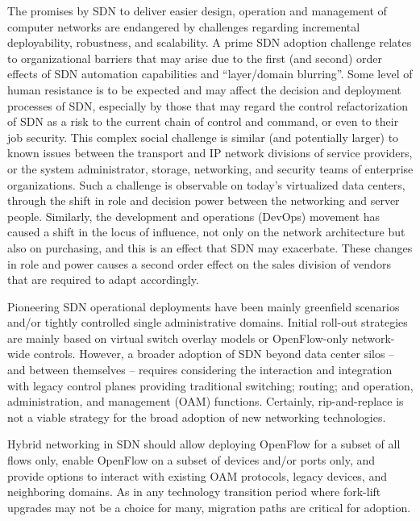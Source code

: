 The promises by SDN to deliver easier design, operation and management of computer networks are endangered
by challenges regarding incremental deployability, robustness, and scalability. 
A prime SDN adoption challenge relates to organizational barriers that may arise due to the first (and second) order 
effects of SDN automation capabilities and ``layer/domain blurring''. 
Some level of human resistance is to be expected and may affect the decision and deployment processes of SDN, especially by those that may regard the 
control refactorization of SDN as a risk to the current chain of control and command, or even to their job security. 
This complex social challenge is similar (and potentially larger) to known issues between the transport and IP 
network divisions of service providers, or the system administrator, storage, networking, and security teams 
of enterprise organizations. Such a challenge is observable on today's virtualized data centers, through the shift 
in role and decision power between the networking and server people. Similarly, the development and operations (DevOps) movement has caused a shift in the locus of influence, not only 
on the network architecture but also on purchasing, and this is an effect that SDN may exacerbate. These changes in role and power causes a second order effect on the sales division of vendors that are required to adapt accordingly. 


Pioneering SDN operational deployments have been mainly greenfield scenarios and/or tightly controlled single 
administrative domains. Initial roll-out strategies are mainly based on virtual switch overlay models or 
OpenFlow-only network-wide controls. However, a broader adoption of SDN beyond data center silos -- and 
between themselves -- requires considering the interaction and integration with legacy control planes providing 
traditional switching; routing; and operation, administration, and management (OAM) functions. Certainly, 
rip-and-replace is not a viable strategy for the broad adoption of new networking technologies.

Hybrid networking in SDN should allow deploying OpenFlow for a subset of all flows only, enable OpenFlow on 
a subset of devices and/or ports only, and provide options to 
interact with existing OAM protocols, legacy devices, and neighboring domains. As in any technology transition 
period where fork-lift upgrades may not be a choice for many, migration paths are critical for 
adoption.

